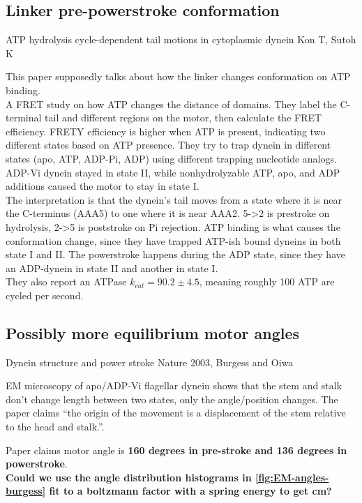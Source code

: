 \documentclass[10pt]{article} %
\begin{document}
\subsection{Linker pre-powerstroke conformation}
ATP hydrolysis cycle-dependent tail motions in cytoplasmic dynein
Kon T, Sutoh K

This paper supposedly talks about how the linker changes conformation on ATP binding.\\

A FRET study on how ATP changes the distance of domains. They label the C-terminal tail and different regions on the motor, then calculate the FRET efficiency. FRETY efficiency is higher when ATP is present, indicating two different states based on ATP presence. They try to trap dynein in different states (apo, ATP, ADP-Pi, ADP) using different trapping nucleotide analogs. ADP-Vi dynein stayed in state II, while nonhydrolyzable ATP, apo, and ADP additions caused the motor to stay in state I.\\

The interpretation is that the dynein's tail moves from a state where it is near the C-terminus (AAA5) to one where it is near AAA2. 5->2 is prestroke on hydrolysis, 2->5 is poststroke on Pi rejection. ATP binding is what causes the conformation change, since they have trapped ATP-ish bound dyneins in both state I and II. The powerstroke happens during the ADP state, since they have an ADP-dynein in state II and another in state I.\\

They also report an ATPase $k_{cat} = 90.2 \pm 4.5$, meaning roughly 100 ATP are cycled per second.\\

\subsection{Possibly more equilibrium motor angles}
Dynein structure and power stroke
Nature 2003, Burgess and Oiwa

EM microscopy of apo/ADP-Vi flagellar dynein shows that the stem and stalk don't change length between two states, only the angle/position changes. The paper claims ``the origin of the movement is a displacement of the stem relative to the head and stalk.''.

Paper claims motor angle is \textbf{160 degrees in pre-stroke and 136 degrees in powerstroke}.\\

\textbf{Could we use the angle distribution histograms in \ref{fig:EM-angles-burgess} fit to a boltzmann factor with a spring energy to get cm?}
\end{document}
